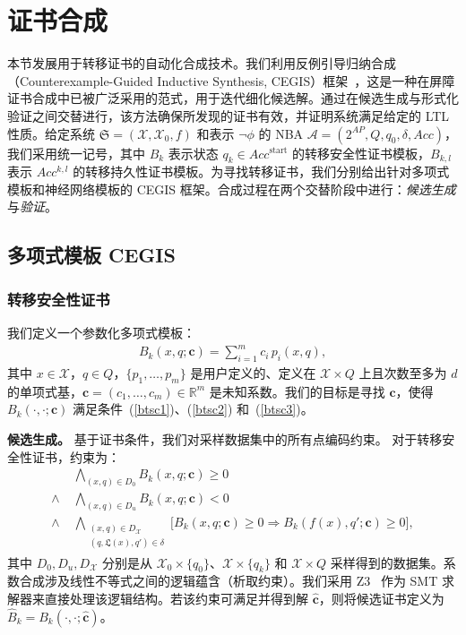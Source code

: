 ﻿\section{证书合成}
\label{sec:synthesis}
本节发展用于转移证书的自动化合成技术。我们利用反例引导归纳合成（Counterexample-Guided Inductive Synthesis, CEGIS）框架~\cite{solar2008program}，这是一种在屏障证书合成中已被广泛采用的范式，用于迭代细化候选解。通过在候选生成与形式化验证之间交替进行，该方法确保所发现的证书有效，并证明系统满足给定的 LTL 性质。给定系统 $\mathfrak{S} = (\mathcal{X}, \mathcal{X}_0, f)$ 和表示 $\neg \phi$ 的 NBA $\mathcal{A} = (2^{AP}, Q, q_0, \delta, Acc)$，我们采用统一记号，其中 $B_k$ 表示状态 $q_k \in Acc^{\text{start}}$ 的转移安全性证书模板，$B_{k,l}$ 表示 $Acc^{k,l}$ 的转移持久性证书模板。为寻找转移证书，我们分别给出针对多项式模板和神经网络模板的 CEGIS 框架。合成过程在两个交替阶段中进行：\textit{候选生成}与\textit{验证}。

\subsection{多项式模板 CEGIS}
\subsubsection{转移安全性证书} 
我们定义一个参数化多项式模板：
\begin{align}
B_k(x, q; \mathbf{c}) = \sum_{i=1}^{m} c_i \, p_i(x, q),
\end{align}
其中 $x \in \mathcal{X}$，$q \in Q$，$\{p_1, \ldots, p_m\}$ 是用户定义的、定义在 $\mathcal{X} \times Q$ 上且次数至多为 $d$ 的单项式基，$\mathbf{c} = (c_1, \ldots, c_m) \in \mathbb{R}^m$ 是未知系数。我们的目标是寻找 $\mathbf{c}$，使得 $B_k(\cdot, \cdot; \mathbf{c})$ 满足条件~(\ref{btsc1})、(\ref{btsc2}) 和~(\ref{btsc3})。

\textbf{候选生成。} 基于证书条件，我们对采样数据集中的所有点编码约束。
对于转移安全性证书，约束为：
\begin{align}
  &\bigwedge_{(x,q) \in D_0} B_k(x, q; \mathbf{c}) \geq 0 \label{smt:init} \\ 
  \wedge \; &\bigwedge_{(x,q) \in D_u} B_k(x, q; \mathbf{c}) < 0 \label{smt:unsafe} \\ 
  \wedge \; &\bigwedge_{\substack{(x,q) \in D_{\mathcal{X}} \\ (q, \mathfrak{L}(x), q') \in \delta}} \big[ B_k(x, q; \mathbf{c}) \geq 0 \Rightarrow B_k(f(x), q'; \mathbf{c}) \geq 0 \big], \label{smt:inv}
\end{align}
其中 $D_0, D_u, D_{\mathcal{X}}$ 分别是从 $\mathcal{X}_0 \times \{q_0\}$、$\mathcal{X} \times \{q_k\}$ 和 $\mathcal{X} \times Q$ 采样得到的数据集。系数合成涉及线性不等式之间的逻辑蕴含（析取约束）。我们采用 Z3~\cite{de2008z3} 作为 SMT 求解器来直接处理该逻辑结构。若该约束可满足并得到解 $\hat{\mathbf{c}}$，则将候选证书定义为 $\hat{B}_k = B_k(\cdot, \cdot; \hat{\mathbf{c}})$。


